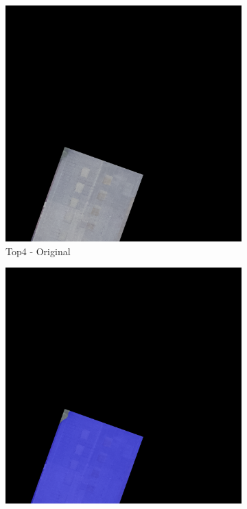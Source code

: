 \begin{figure}[H]
\begin{subfigure}{0.32\textwidth}
    \includegraphics[width=\textwidth]{02-main//figures/ch4/kfold_ensembles/unetplusplus_tu-efficientnetv2_rw_s.ra2_in1k/best_cases/best_2_iou0.982_25061124_tile_11_8_51e0da_original.png}
    \caption{Top4 - Original}
\end{subfigure}
\hfill
\begin{subfigure}{0.32\textwidth}
    \includegraphics[width=\textwidth]{02-main//figures/ch4/kfold_ensembles/unetplusplus_tu-efficientnetv2_rw_s.ra2_in1k/best_cases/best_2_iou0.982_25061124_tile_11_8_51e0da_overlay_gt.png}

\end{subfigure}
\end{figure}
